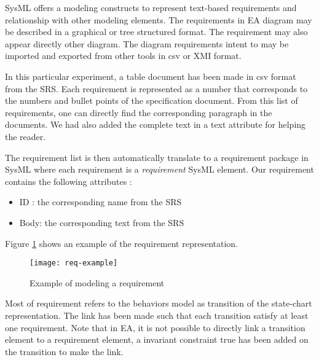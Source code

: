 SysML offers a modeling constructs to represent text-based requirements and
relationship with other modeling elements. The requirements in EA diagram may be
described in a graphical or tree structured format. The requirement may also
appear directly other diagram. The diagram requirements  intent to  may be imported and
exported from other tools in csv or XMI format.

In this particular experiment, a table document has been made in csv format from
the SRS.
Each requirement is represented as a number that corresponds to the numbers and bullet points
of the specification document. From this list of requirements, one can directly
find the corresponding paragraph in the documents. We had also added the
complete text in a text attribute  for helping the reader. 



The requirement list is then automatically translate to a requirement package  in SysML where
each requirement is a \emph{requirement} SysML element. Our requirement contains
the following attributes :
\begin{itemize}
\item ID : the corresponding name from the SRS
\item Body: the corresponding text from the SRS
\end{itemize}
Figure \ref{fig:req-example} shows an example of the requirement representation.
\begin{figure}[htbp]
\centering
\texttt{[image: req-example]}
\caption{\label{fig:req-example} Example of modeling a requirement}
\end{figure}


Most of requirement refers to the behaviors model as transition of the state-chart
representation.  The link has been made such that each transition satisfy at
least one requirement. Note that in EA, it is not possible to directly link a
transition element to a requirement element, a invariant constraint true has been
added on the transition to make the link.

